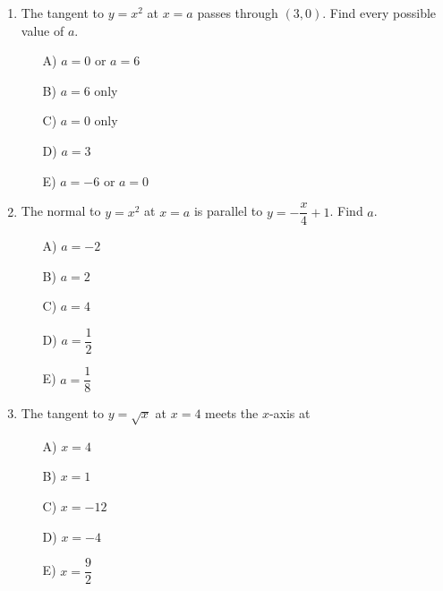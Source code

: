 \documentclass[11pt,a4paper]{article}
\newlength{\ipadheight}
\renewcommand{\ans}[1]{%
  \par\noindent
  \begin{minipage}[t][\ipadheight][t]{\linewidth}%
    \raggedleft\vspace*{\fill}%
    {\fontsize{4}{5}\selectfont\color{black!22}\rotatebox{180}{Ans:~#1}}%
  \end{minipage}%
  \par\vspace{4pt}}
\renewcommand{\method}[1]{}
\renewcommand{\inv}[1]{}
\begin{document}
\begin{enumerate}
\needspace{10cm}
\item The tangent to $y=x^2$ at $x=a$ passes through $(3,0)$. Find every possible value of $a$.
\begin{itemize}
\item[A)] $a=0$ or $a=6$
\item[B)] $a=6$ only
\item[C)] $a=0$ only
\item[D)] $a=3$
\item[E)] $a=-6$ or $a=0$
\end{itemize}

\ans{A) $a=0$ or $a=6$}
\method{The tangent at $x=a$ is $y=2ax-a^2$. Put $(3,0)$ on it: $0=6a-a^2=a(6-a)$, so $a=0$ or $a=6$. Decoys: B discards $a=0$; C discards $a=6$; D takes the external point's $x$-coordinate as $a$; E comes from the sign slip $0=-6a-a^2$.}
\inv{For a general point $(p,0)$, solve $0=2ap-a^2$. How many tangents to $y=x^2$ pass through $(p,0)$ when $p\neq0$, and what happens when $p=0$?}

\needspace{10cm}
\item The normal to $y=x^2$ at $x=a$ is parallel to $y=-\dfrac{x}{4}+1$. Find $a$.
\begin{itemize}
\item[A)] $a=-2$
\item[B)] $a=2$
\item[C)] $a=4$
\item[D)] $a=\dfrac{1}{2}$
\item[E)] $a=\dfrac{1}{8}$
\end{itemize}

\ans{B) $a=2$}
\method{The tangent gradient at $x=a$ is $2a$, so the normal gradient is $-\frac{1}{2a}$. Parallel to $y=-\frac{x}{4}+1$ means $-\frac{1}{2a}=-\frac14$, so $2a=4$ and $a=2$. Decoys: A drops the minus; C forgets the factor $2$; D reciprocates the answer; E multiplies by $2$ instead of dividing.}
\inv{Show that the normal to $y=x^2$ at $x=a$ is parallel to the tangent at $x=b$ exactly when $ab=-\frac14$. What does that say about the tangents at $a$ and $b$?}

\needspace{10cm}
\item The tangent to $y=\sqrt{x}$ at $x=4$ meets the $x$-axis at
\begin{itemize}
\item[A)] $x=4$
\item[B)] $x=1$
\item[C)] $x=-12$
\item[D)] $x=-4$
\item[E)] $x=\dfrac{9}{2}$
\end{itemize}


\end{enumerate}
\end{document}
